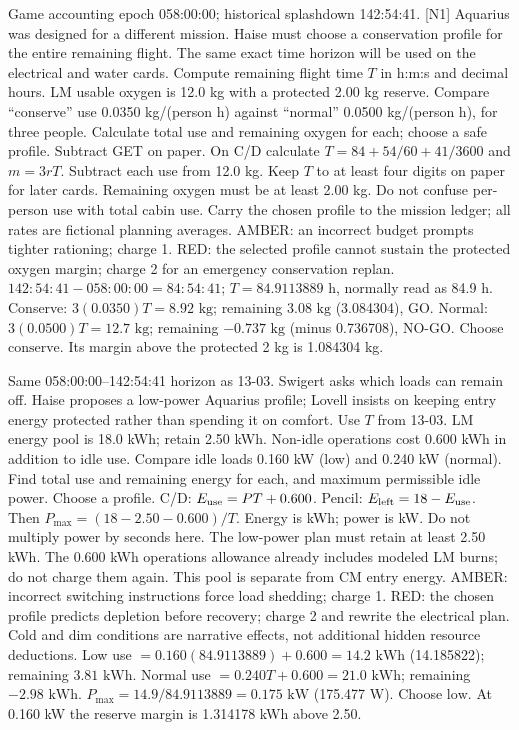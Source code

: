 {Game accounting epoch 058:00:00; historical splashdown 142:54:41. [N1]}
{Aquarius was designed for a different mission. Haise must choose a
conservation profile for the entire remaining flight. The same exact
time horizon will be used on the electrical and water cards.}
{Compute remaining flight time \(T\) in h:m:s and decimal hours.
LM usable oxygen is 12.0 kg with a protected 2.00 kg reserve.
Compare ``conserve'' use 0.0350 kg/(person h) against ``normal''
0.0500 kg/(person h), for three people.
Calculate total use and remaining oxygen for each; choose a safe profile.}
{Subtract GET on paper.
On C/D calculate \(T=84+54/60+41/3600\) and
\(m=3rT\). Subtract each use from 12.0 kg.
Keep \(T\) to at least four digits on paper for later cards.}
{Remaining oxygen must be at least 2.00 kg.
Do not confuse per-person use with total cabin use.
Carry the chosen profile to the mission ledger; all rates are
fictional planning averages.}
{AMBER: an incorrect budget prompts tighter rationing; charge 1.
RED: the selected profile cannot sustain the protected oxygen margin;
charge 2 for an emergency conservation replan.}
{\(142{:}54{:}41-058{:}00{:}00
=\boxed{84{:}54{:}41}\);
\(T=\boxed{84.9113889\text{ h}}\), normally read as 84.9 h.
Conserve: \(3(0.0350)T=\boxed{8.92\text{ kg}}\);
remaining \(\boxed{3.08\text{ kg}}\) (3.084304), GO.
Normal: \(3(0.0500)T=\boxed{12.7\text{ kg}}\);
remaining \(\boxed{-0.737\text{ kg}}\) (minus 0.736708), NO-GO.
Choose \(\boxed{\text{conserve}}\).
Its margin above the protected 2 kg is 1.084304 kg.}

{Same 058:00:00--142:54:41 horizon as 13-03.}
{Swigert asks which loads can remain off.
Haise proposes a low-power Aquarius profile; Lovell insists on
keeping entry energy protected rather than spending it on comfort.}
{Use \(T\) from 13-03. LM energy pool is 18.0 kWh; retain 2.50 kWh.
Non-idle operations cost 0.600 kWh in addition to idle use.
Compare idle loads 0.160 kW (low) and 0.240 kW (normal).
Find total use and remaining energy for each, and maximum permissible
idle power. Choose a profile.}
{C/D: \(E_{\rm use}=PT+0.600\).
Pencil: \(E_{\rm left}=18-E_{\rm use}\).
Then \(P_{\max}=(18-2.50-0.600)/T\).
Energy is kWh; power is kW. Do not multiply power by seconds here.}
{The low-power plan must retain at least 2.50 kWh.
The 0.600 kWh operations allowance already includes modeled LM burns;
do not charge them again. This pool is separate from CM entry energy.}
{AMBER: incorrect switching instructions force load shedding; charge 1.
RED: the chosen profile predicts depletion before recovery; charge 2
and rewrite the electrical plan. Cold and dim conditions are narrative
effects, not additional hidden resource deductions.}
{Low use \(=0.160(84.9113889)+0.600
=\boxed{14.2\text{ kWh}}\) (14.185822);
remaining \(\boxed{3.81\text{ kWh}}\).
Normal use \(=0.240T+0.600=\boxed{21.0\text{ kWh}}\);
remaining \(\boxed{-2.98\text{ kWh}}\).
\(P_{\max}=14.9/84.9113889
=\boxed{0.175\text{ kW}}\) (175.477 W).
Choose \(\boxed{\text{low}}\).
At 0.160 kW the reserve margin is 1.314178 kWh above 2.50.}


